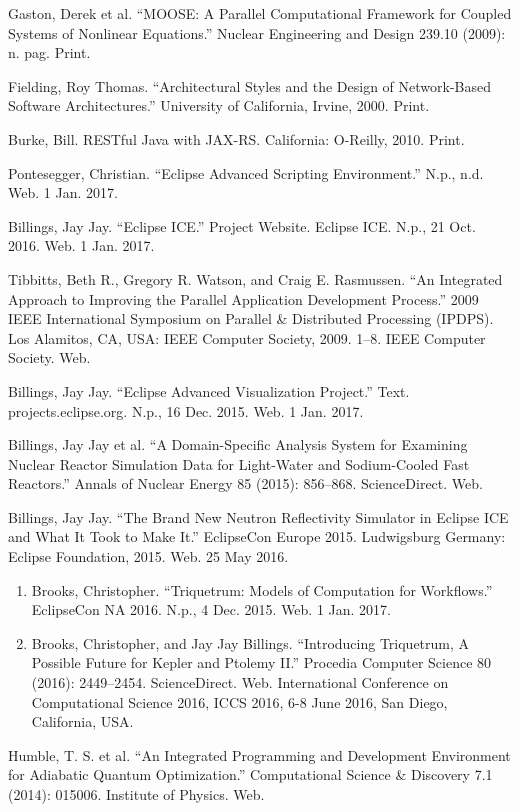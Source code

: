 Gaston, Derek et al. ``MOOSE: A Parallel Computational Framework for
Coupled Systems of Nonlinear Equations.'' Nuclear Engineering and Design
239.10 (2009): n. pag. Print.

Fielding, Roy Thomas. ``Architectural Styles and the Design of
Network-Based Software Architectures.'' University of California,
Irvine, 2000. Print.

Burke, Bill. RESTful Java with JAX-RS. California: O-Reilly, 2010.
Print.

Pontesegger, Christian. ``Eclipse Advanced Scripting Environment.''
N.p., n.d. Web. 1 Jan. 2017.

Billings, Jay Jay. ``Eclipse ICE.'' Project Website. Eclipse ICE. N.p.,
21 Oct. 2016. Web. 1 Jan. 2017.

Tibbitts, Beth R., Gregory R. Watson, and Craig E. Rasmussen. ``An
Integrated Approach to Improving the Parallel Application Development
Process.'' 2009 IEEE International Symposium on Parallel \& Distributed
Processing (IPDPS). Los Alamitos, CA, USA: IEEE Computer Society, 2009.
1--8. IEEE Computer Society. Web.

Billings, Jay Jay. ``Eclipse Advanced Visualization Project.'' Text.
projects.eclipse.org. N.p., 16 Dec. 2015. Web. 1 Jan. 2017.

Billings, Jay Jay et al. ``A Domain-Specific Analysis System for
Examining Nuclear Reactor Simulation Data for Light-Water and
Sodium-Cooled Fast Reactors.'' Annals of Nuclear Energy 85 (2015):
856--868. ScienceDirect. Web.

Billings, Jay Jay. ``The Brand New Neutron Reflectivity Simulator in
Eclipse ICE and What It Took to Make It.'' EclipseCon Europe 2015.
Ludwigsburg Germany: Eclipse Foundation, 2015. Web. 25 May 2016.

\begin{enumerate}
\def\labelenumi{\arabic{enumi}.}
\item
  Brooks, Christopher. ``Triquetrum: Models of Computation for
  Workflows.'' EclipseCon NA 2016. N.p., 4 Dec. 2015. Web. 1 Jan. 2017.
\item
  Brooks, Christopher, and Jay Jay Billings. ``Introducing Triquetrum, A
  Possible Future for Kepler and Ptolemy II.'' Procedia Computer Science
  80 (2016): 2449--2454. ScienceDirect. Web. International Conference on
  Computational Science 2016, ICCS 2016, 6-8 June 2016, San Diego,
  California, USA.
\end{enumerate}

Humble, T. S. et al. ``An Integrated Programming and Development
Environment for Adiabatic Quantum Optimization.'' Computational Science
\& Discovery 7.1 (2014): 015006. Institute of Physics. Web.

